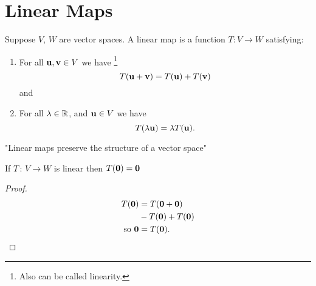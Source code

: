 \documentclass[10pt, a4paper]{article}
\begin{document}
\section{Linear Maps}
\begin{definition}
    Suppose $V$,
    $W$ are vector spaces.
    A linear map is a function $T : V \rightarrow W$ satisfying:
    \begin{enumerate}[label = (\roman*)]
        \item For all $\mathbf{u}, \mathbf{v} \in V$ we have
        \footnote{Also can be called linearity.}
        \[
        T(\mathbf{u} + \mathbf{v}) = T(\mathbf{u}) + T(\mathbf{v})
        \]
        and
        \item For all $\lambda \in \mathbb{R}$,
        and $\mathbf{u} \in V$ we have
        \[
        T(\lambda\mathbf{u}) = \lambda T(\mathbf{u}).
        \]
    \end{enumerate}
\end{definition}
"Linear maps preserve the structure of a vector space"

\begin{lemma}
    If $T\,:\, V \rightarrow W$ is linear then $T(\mathbf{0}) = \mathbf{0}$
    \begin{proof}
        \begin{align*}
            T(\mathbf{0}) &= T(\mathbf{0 + 0}) \\
            &- T(\mathbf{0}) + T(\mathbf{0}) \\
            \text{so } \mathbf{0} &= T(\mathbf{0}).
        \end{align*}
    \end{proof}
\end{lemma}
\end{document}

